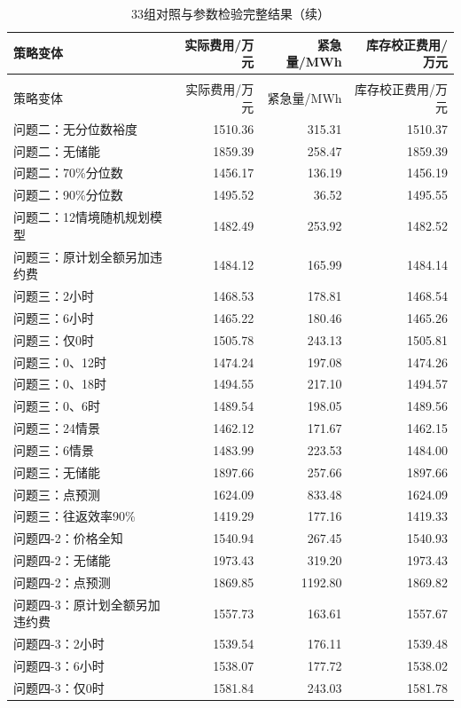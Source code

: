 {\small\begin{longtable}{lrrr}
\caption{33组对照与参数检验完整结果（二月至十二月）}\\\toprule
策略变体 & 实际费用/万元 & 紧急量/MWh & 库存校正费用/万元\\\midrule\endfirsthead
\caption[]{33组对照与参数检验完整结果（续）}\\\toprule
策略变体 & 实际费用/万元 & 紧急量/MWh & 库存校正费用/万元\\\midrule\endhead
问题二：无分位数裕度 & 1510.36 & 315.31 & 1510.37\\
问题二：无储能 & 1859.39 & 258.47 & 1859.39\\
问题二：70\%分位数 & 1456.17 & 136.19 & 1456.19\\
问题二：90\%分位数 & 1495.52 & 36.52 & 1495.55\\
问题二：12情境随机规划模型 & 1482.49 & 253.92 & 1482.52\\
问题三：原计划全额另加违约费 & 1484.12 & 165.99 & 1484.14\\
问题三：2小时 & 1468.53 & 178.81 & 1468.54\\
问题三：6小时 & 1465.22 & 180.46 & 1465.26\\
问题三：仅0时 & 1505.78 & 243.13 & 1505.81\\
问题三：0、12时 & 1474.24 & 197.08 & 1474.26\\
问题三：0、18时 & 1494.55 & 217.10 & 1494.57\\
问题三：0、6时 & 1489.54 & 198.05 & 1489.56\\
问题三：24情景 & 1462.12 & 171.67 & 1462.15\\
问题三：6情景 & 1483.99 & 223.53 & 1484.00\\
问题三：无储能 & 1897.66 & 257.66 & 1897.66\\
问题三：点预测 & 1624.09 & 833.48 & 1624.09\\
问题三：往返效率90\% & 1419.29 & 177.16 & 1419.33\\
问题四-2：价格全知 & 1540.94 & 267.45 & 1540.93\\
问题四-2：无储能 & 1973.43 & 319.20 & 1973.43\\
问题四-2：点预测 & 1869.85 & 1192.80 & 1869.82\\
问题四-3：原计划全额另加违约费 & 1557.73 & 163.61 & 1557.67\\
问题四-3：2小时 & 1539.54 & 176.11 & 1539.48\\
问题四-3：6小时 & 1538.07 & 177.72 & 1538.02\\
问题四-3：仅0时 & 1581.84 & 243.03 & 1581.78\\

\end{longtable}}
